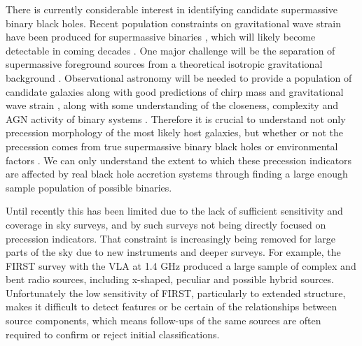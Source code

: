 \documentclass{aa}
\begin{document}
There is currently considerable interest in identifying candidate supermassive binary black holes. Recent population constraints on gravitational wave strain have been produced for supermassive binaries \citep{agazie23}, which will likely become detectable in coming decades \citep[e.g.,][]{buonanno14}. One major challenge will be the separation of supermassive foreground sources \citep[e.g.,][]{babak12,riles13,agazie23b} from a theoretical isotropic gravitational background \citep[e.g.,][]{arzoumanian20,reardon23}. Observational astronomy will be needed to provide a population of candidate galaxies along with good predictions of chirp mass and gravitational wave strain \citep{babak16}, along with some understanding of the closeness, complexity and AGN activity of binary systems \citep{burkespolaor11,pfeifle24}. Therefore it is crucial to understand not only precession morphology of the most likely host galaxies, but whether or not the precession comes from true supermassive binary black holes or environmental factors \citep[e.g.,][]{steinle24,bourne24}. We can only understand the extent to which these precession indicators are affected by real black hole accretion systems through finding a large enough sample population of possible binaries.

Until recently this has been limited due to the lack of sufficient sensitivity and coverage in sky surveys, and by such surveys not being directly focused on precession indicators. That constraint is increasingly being removed for large parts of the sky due to new instruments and deeper surveys. For example, the FIRST survey with the VLA at 1.4 GHz \citep{cheung07,proctor11,yang19} produced a large sample of complex and bent radio sources, including x-shaped, peculiar and possible hybrid sources. Unfortunately the low sensitivity of FIRST, particularly to extended structure, makes it difficult to detect features or be certain of the relationships between source components, which means follow-ups of the same sources are often required to confirm or reject initial classifications.
\end{document}
